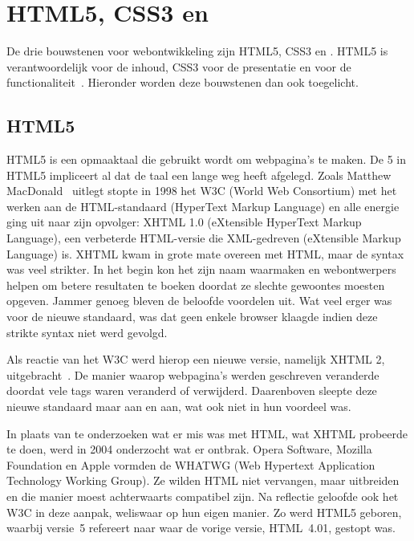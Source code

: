 
\section{HTML5, CSS3 en \js}
\label{sec:html5-css3-js}
De drie bouwstenen voor webontwikkeling zijn HTML5, CSS3 en \js{}. 
HTML5 is verantwoordelijk voor de inhoud, CSS3 voor de presentatie en \js{} voor de functionaliteit~\cite{PhilDutson2012}. 
Hieronder worden deze bouwstenen dan ook toegelicht.

\subsection{HTML5}
\label{sec:html5}
HTML5 is een opmaaktaal die gebruikt wordt om webpagina's te maken.
De 5 in HTML5 impliceert al dat de taal een lange weg heeft afgelegd.
Zoals Matthew MacDonald~\cite{MacDonald2011} uitlegt stopte in 1998 het W3C (World Web Consortium) met het werken aan de HTML-standaard (HyperText Markup Language) en alle energie ging uit naar zijn opvolger: XHTML 1.0 (eXtensible HyperText Markup Language), een verbeterde HTML-versie die XML-gedreven (eXtensible Markup Language) is. 
XHTML kwam in grote mate overeen met HTML, maar de syntax was veel strikter. 
In het begin kon het zijn naam waarmaken en webontwerpers helpen om betere resultaten te boeken doordat ze slechte gewoontes moesten opgeven. 
Jammer genoeg bleven de beloofde voordelen uit. 
Wat veel erger was voor de nieuwe standaard, was dat geen enkele browser klaagde indien deze strikte syntax niet werd gevolgd.

Als reactie van het W3C werd hierop  een nieuwe versie, namelijk XHTML 2, uitgebracht~\cite{MacDonald2011}.
De manier waarop webpagina's werden geschreven veranderde doordat vele tags waren veranderd of verwijderd. 
Daarenboven sleepte deze nieuwe standaard maar aan en aan, wat ook niet in hun voordeel was. 

In plaats van te onderzoeken wat er mis was met HTML, wat XHTML probeerde te doen, werd in 2004 onderzocht wat er ontbrak. 
Opera Software, Mozilla Foundation en Apple vormden de WHATWG (Web Hypertext Application Technology Working Group). 
Ze wilden HTML niet vervangen, maar uitbreiden en die manier moest achterwaarts compatibel zijn. 
Na reflectie geloofde ook het W3C in deze aanpak, weliswaar op hun eigen manier.  
Zo werd HTML5 geboren, waarbij versie~5 refereert naar waar de vorige versie, HTML~4.01, gestopt was.

